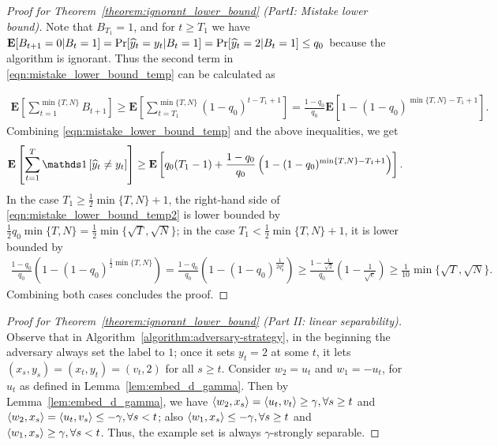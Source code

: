 \begin{proof}[Proof for Theorem~\ref{theorem:ignorant_lower_bound} (PartI: Mistake lower bound)]
Note that $B_{T_1}=1$, and for $t\geq T_1$ we have $\operatorname*{\mathbf{E}}[B_{t+1}=0|B_t=1]=\Pr[\widehat y_t=y_t|B_t=1]=\Pr[\widehat y_t=2|B_t=1]\leq q_0$ because the algorithm is ignorant. Thus the second term in \eqref{eqn:mistake_lower_bound_temp} can be calculated as

\begin{align*}
    \mathbf{E}\left[\sum_{t=1}^{\min\{T,N\}}B_{t+1}\right]\geq \mathbf{E}\left[\sum_{t=T_1}^{\min\{ T,N \}} (1-q_0)^{t-T_1+1} \right]
    = \frac{1-q_0}{q_0}\mathbf{E}\left[1-(1-q_0)^{\min\{T,N\}-T_1+1}\right].
\end{align*}
Combining \eqref{eqn:mistake_lower_bound_temp} and the above inequalities, we get
\begin{align}
    \mathbf{E}\left[\sum_{t=1}^T \indicator{\widehat y_t\neq y_t}\right]\geq \mathbf{E}\left[q_0(T_1-1)+\frac{1-q_0}{q_0}\left(1-(1-q_0)^{\min\{T,N\}-T_1+1}\right)\right]. \label{eqn:mistake_lower_bound_temp2}
\end{align}
In the case $T_1\geq \frac{1}{2}\min\{T,N\}+1$, the right-hand side of \eqref{eqn:mistake_lower_bound_temp2} is lower bounded by $\frac{1}{2}q_0\min\{T,N\}=\frac{1}{2}\min\{\sqrt{T}, \sqrt{N}\}$; in the case $T_1< \frac{1}{2}\min\{T,N\}+1$, it is lower bounded by
\begin{align*}
    \frac{1-q_0}{q_0}\left(1-(1-q_0)^{\frac{1}{2}\min\{T,N\}}\right)= \frac{1-q_0}{q_0}\left(1-(1-q_0)^{\frac{1}{2q_0^2}}\right)\geq \frac{1-\frac{1}{\sqrt{2}}}{q_0}\left(1-\frac{1}{\sqrt{e}}\right)\geq \frac{1}{10}\min\{\sqrt{T}, \sqrt{N}\}.
\end{align*}
Combining both cases concludes the proof.
\end{proof}

\begin{proof}[Proof for Theorem~\ref{theorem:ignorant_lower_bound} (Part II: linear separability)]
Observe that in Algorithm~\ref{algorithm:adversary-strategy}, in the beginning the adversary always set the label to $1$;
once it sets $y_t=2$ at some $t$, it lets $(x_s, y_s)=(x_t, y_t)=(v_t, 2)$ for all $s\geq t$.
Consider $w_2=u_t$ and $w_1=-u_t$, for $u_t$ as defined in Lemma~\ref{lem:embed_d_gamma}.
Then by Lemma~\ref{lem:embed_d_gamma}, we have $\left\langle w_2, x_s \right\rangle = \left\langle u_t, v_t \right\rangle \geq \gamma, \forall s \geq t$
and $\left\langle w_2, x_s \right\rangle = \left\langle u_t, v_s \right\rangle \leq - \gamma, \forall s< t$;
also $\left\langle w_1, x_s \right\rangle \leq -\gamma, \forall s \geq t$
and $\left\langle w_1, x_s \right\rangle \geq  \gamma, \forall s<t$.
Thus, the example set is always $\gamma$-strongly separable.
\end{proof}
